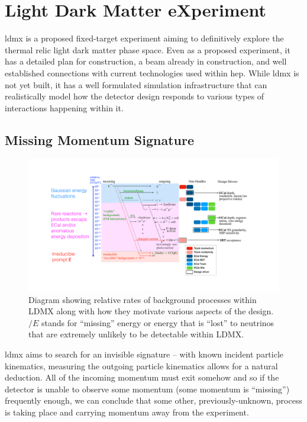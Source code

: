 \chapter{Light Dark Matter eXperiment}
\label{chapter:ldmx:experiment}

\ac{ldmx} is a proposed fixed-target experiment aiming to definitively explore
the thermal relic light dark matter phase space. Even as a proposed experiment, it has a detailed
plan for construction, a beam already in construction, and well established connections
with current technologies used within \ac{hep}. While \ac{ldmx} is not yet built,
it has a well formulated simulation infrastructure that can realistically model
how the detector design responds to various types of interactions happening within it.

\section{Missing Momentum Signature}

\begin{figure}
  \centering
  \includegraphics[width=\textwidth]{figures/ldmx/experiment/reaction_staircase_with_designDrivers.pdf}
  \caption{
    Diagram showing relative rates of background processes within LDMX along with
    how they motivate various aspects of the design. $\slash{E}$ stands for ``missing''
    energy or energy that is ``lost'' to neutrinos that are extremely unlikely to be
    detectable within LDMX.
  }
  \label{fig:ldmx-bkgd-staircase}
\end{figure}

\ac{ldmx} aims to search for an invisible signature -- with known incident particle kinematics,
measuring the outgoing particle kinematics allows for a natural deduction. All of the incoming
momentum must exit somehow and so if the detector is unable to observe some momentum (some momentum
is ``missing'') frequently enough, we can conclude that some other, previously-unknown, process
is taking place and carrying momentum away from the experiment.

